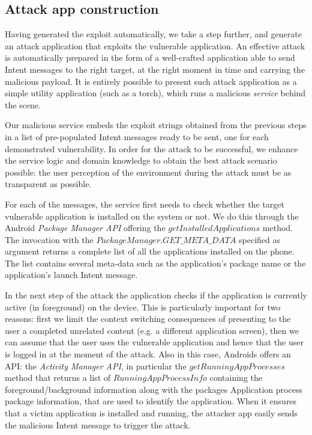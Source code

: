 \subsection{Attack app construction}
Having generated the exploit automatically, we take a step further, and 
generate an attack application that exploits the vulnerable application. 
An effective attack is automatically prepared in the form of a well-crafted application able to send
Intent messages to the right target, at the right moment in time and carrying the malicious payload.
It is entirely possible to present such attack application as a simple utility application (such as a torch), 
which runs a malicious \emph{service} behind the scene.

Our malicious service embeds the exploit strings obtained from the previous steps in a list of pre-populated
Intent messages ready to be sent, one for each demonstrated vulnerability.
In order for the attack to be successful, we enhance the service logic and domain knowledge to
obtain the best attack scenario possible: the user perception of the environment during the attack must
be as transparent as possible.

For each of the messages, the service first needs to check whether the target vulnerable application
is installed on the system or not. We do this through the Android \emph{Package Manager API} offering
the $getInstalledApplications$ method. The invocation with the $PackageManager.GET\_META\_DATA$ specified as argument
returns a complete list of all the applications installed on the phone. The list contains several meta-data such as
the application's package name or the application's launch Intent message.

In the next step of the attack the application checks if the application is currently active (in foreground) on the device.
This is particularly important for two reasons: first we limit the context switching consequences of presenting
to the user a completed unrelated content (e.g. a different application screen), then we can assume
that the user uses the vulnerable application and hence that the user is logged in at the moment of the attack.
Also in this case, Androids offers an API: the \emph{Activity Manager API},
in particular the $getRunningAppProcesses$ method that returns a list of $RunningAppProcessInfo$ containing the foreground/background information along with the packages Application process package information, that are used to identify the application. When it ensures that a victim application is installed and running, the attacker app easily sends the malicious Intent message to trigger the attack.


